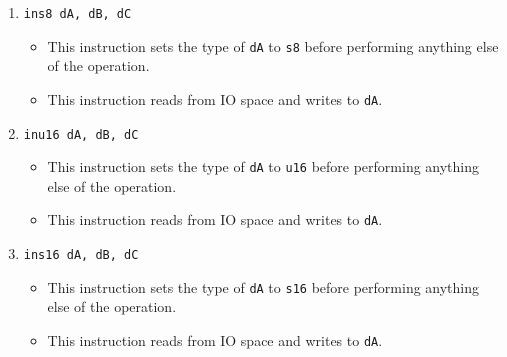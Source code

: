 \documentclass{article}
\begin{document}
\begin{itemize}
\begin{enumerate}
			\item \texttt{ins8 dA, dB, dC}
				\begin{itemize}
				\item This instruction sets the type of \texttt{dA} to
					\texttt{s8} before performing anything else of the
					operation.
				\item This instruction reads from IO space and writes to
					\texttt{dA}.
				\end{itemize}
			\item \texttt{inu16 dA, dB, dC}
				\begin{itemize}
				\item This instruction sets the type of \texttt{dA} to
					\texttt{u16} before performing anything else of the
					operation.
				\item This instruction reads from IO space and writes to
					\texttt{dA}.
				\end{itemize}
			\item \texttt{ins16 dA, dB, dC}
				\begin{itemize}
				\item This instruction sets the type of \texttt{dA} to
					\texttt{s16} before performing anything else of the
					operation.
				\item This instruction reads from IO space and writes to
					\texttt{dA}.
				\end{itemize}


\end{enumerate}
\end{itemize}
\end{document}
